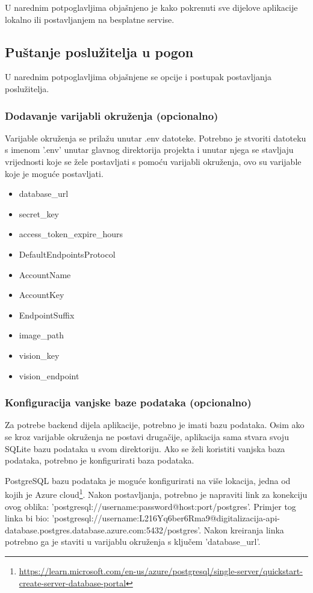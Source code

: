 			{U narednim potpoglavljima objašnjeno je kako pokrenuti sve dijelove aplikacije lokalno ili postavljanjem na besplatne servise.}
		
			\subsection{Puštanje poslužitelja u pogon}
			
			{U narednim potpoglavljima objašnjene se opcije i postupak postavljanja poslužitelja.}
			
			\subsubsection{Dodavanje varijabli okruženja (opcionalno)}
			
			{Varijable okruženja se prilažu unutar .env datoteke. Potrebno je stvoriti datoteku s imenom '.env' unutar glavnog direktorija projekta i unutar njega se stavljaju vrijednosti koje se žele postavljati s pomoću varijabli okruženja, ovo su varijable koje je moguće postavljati.}
			
			\begin{itemize}
				\item{database\_url}
				\item{secret\_key}
				\item{access\_token\_expire\_hours}
				\item{DefaultEndpointsProtocol}
				\item{AccountName}
				\item{AccountKey}
				\item{EndpointSuffix}
				\item{image\_path}
				\item{vision\_key}
				\item{vision\_endpoint}
			\end{itemize}
			
			\subsubsection{Konfiguracija vanjske baze podataka (opcionalno)}
			
			{Za potrebe backend dijela aplikacije, potrebno je imati bazu podataka. Osim ako se kroz varijable okruženja ne postavi drugačije, aplikacija sama stvara svoju SQLite bazu podataka u svom direktoriju. Ako se želi koristiti vanjska baza podataka, potrebno je konfigurirati baza podataka.}
			
			{PostgreSQL bazu podataka je moguće konfigurirati na više lokacija, jedna od kojih je Azure cloud\footnote{\url{https://learn.microsoft.com/en-us/azure/postgresql/single-server/quickstart-create-server-database-portal}}. Nakon postavljanja, potrebno je napraviti link za konekciju ovog oblika: 'postgresql://{username}:{password}@{host}:{port}/postgres'. Primjer tog linka bi bio: 'postgresql://username:L216Yq6ber6Rma9@digitalizacija-api-database.postgres.database.azure.com:5432/postgres'. Nakon kreiranja linka potrebno ga je staviti u varijablu okruženja s ključem 'database\_url'.}
			
